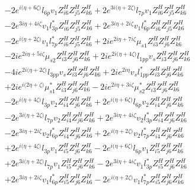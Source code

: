 \begin{align}
 &-2 e^{i \Big(\eta +6 \zeta \Big)} l_{6p} v_1 Z_{{i 6}}^{H} Z_{{j 5}}^{H} Z_{{k 6}}^{H} +2 e^{3 i \Big(\eta +2 \zeta \Big)} l_{7p} v_1 Z_{{i 6}}^{H} Z_{{j 5}}^{H} Z_{{k 6}}^{H} \nonumber \\ 
 &-2 e^{3 i \eta +4 i \zeta } v_1 l_{3p}^* Z_{{i 6}}^{H} Z_{{j 5}}^{H} Z_{{k 6}}^{H} +2 e^{3 i \eta +2 i \zeta } v_1 l_{6p}^* Z_{{i 6}}^{H} Z_{{j 5}}^{H} Z_{{k 6}}^{H} \nonumber \\ 
 &-2 e^{i \Big(\eta +2 \zeta \Big)} v_1 l_{7p}^* Z_{{i 6}}^{H} Z_{{j 5}}^{H} Z_{{k 6}}^{H} +2 i e^{2 i \eta +7 i \zeta } \mu_{s1} Z_{{i 3}}^{H} Z_{{j 6}}^{H} Z_{{k 6}}^{H} \nonumber \\ 
 &-2 i e^{2 i \eta +5 i \zeta } \mu_{s2} Z_{{i 3}}^{H} Z_{{j 6}}^{H} Z_{{k 6}}^{H} +2 i e^{2 i \Big(\eta +4 \zeta \Big)} l_{1pp} v_s Z_{{i 3}}^{H} Z_{{j 6}}^{H} Z_{{k 6}}^{H} \nonumber \\ 
 &-4 i e^{2 i \Big(\eta +2 \zeta \Big)} l_{3pp} v_s Z_{{i 3}}^{H} Z_{{j 6}}^{H} Z_{{k 6}}^{H} +2 i e^{2 i \eta } v_s l_{1pp}^* Z_{{i 3}}^{H} Z_{{j 6}}^{H} Z_{{k 6}}^{H} \nonumber \\ 
 &+2 i e^{i \Big(2 \eta +\zeta \Big)} \mu_{s1}^* Z_{{i 3}}^{H} Z_{{j 6}}^{H} Z_{{k 6}}^{H} -2 i e^{2 i \eta +3 i \zeta } \mu_{s2}^* Z_{{i 3}}^{H} Z_{{j 6}}^{H} Z_{{k 6}}^{H} \nonumber \\ 
 &-2 e^{i \Big(\eta +4 \zeta \Big)} l_{3p} v_2 Z_{{i 4}}^{H} Z_{{j 6}}^{H} Z_{{k 6}}^{H} +2 e^{i \Big(\eta +6 \zeta \Big)} l_{6p} v_2 Z_{{i 4}}^{H} Z_{{j 6}}^{H} Z_{{k 6}}^{H} \nonumber \\ 
 &-2 e^{3 i \Big(\eta +2 \zeta \Big)} l_{7p} v_2 Z_{{i 4}}^{H} Z_{{j 6}}^{H} Z_{{k 6}}^{H} +2 e^{3 i \eta +4 i \zeta } v_2 l_{3p}^* Z_{{i 4}}^{H} Z_{{j 6}}^{H} Z_{{k 6}}^{H} \nonumber \\ 
 &-2 e^{3 i \eta +2 i \zeta } v_2 l_{6p}^* Z_{{i 4}}^{H} Z_{{j 6}}^{H} Z_{{k 6}}^{H} +2 e^{i \Big(\eta +2 \zeta \Big)} v_2 l_{7p}^* Z_{{i 4}}^{H} Z_{{j 6}}^{H} Z_{{k 6}}^{H} \nonumber \\ 
 &+2 e^{i \Big(\eta +4 \zeta \Big)} l_{3p} v_1 Z_{{i 5}}^{H} Z_{{j 6}}^{H} Z_{{k 6}}^{H} -2 e^{i \Big(\eta +6 \zeta \Big)} l_{6p} v_1 Z_{{i 5}}^{H} Z_{{j 6}}^{H} Z_{{k 6}}^{H} \nonumber \\ 
 &+2 e^{3 i \Big(\eta +2 \zeta \Big)} l_{7p} v_1 Z_{{i 5}}^{H} Z_{{j 6}}^{H} Z_{{k 6}}^{H} -2 e^{3 i \eta +4 i \zeta } v_1 l_{3p}^* Z_{{i 5}}^{H} Z_{{j 6}}^{H} Z_{{k 6}}^{H} \nonumber \\ 
 &+2 e^{3 i \eta +2 i \zeta } v_1 l_{6p}^* Z_{{i 5}}^{H} Z_{{j 6}}^{H} Z_{{k 6}}^{H} -2 e^{i \Big(\eta +2 \zeta \Big)} v_1 l_{7p}^* Z_{{i 5}}^{H} Z_{{j 6}}^{H} Z_{{k 6}}^{H} \nonumber \\ 

\end{align}
